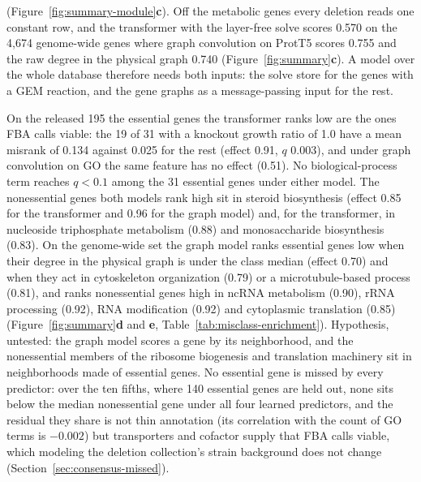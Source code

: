 \begin{description}
    (Figure~\ref{fig:summary-module}\textbf{c}). Off the metabolic genes every deletion reads
    one constant row, and the transformer with the layer-free solve scores 0.570 on
    the 4,674 genome-wide genes where graph convolution on ProtT5 scores 0.755 and the
    raw degree in the physical graph 0.740 (Figure~\ref{fig:summary}\textbf{c}). A
    model over the whole database therefore needs both inputs: the solve store for the
    genes with a GEM reaction, and the gene graphs as a message-passing input for the
    rest.
  \item[The two families miss different genes, and the annotations say which.] On the
    released 195 the essential genes the transformer ranks low are the ones FBA calls
    viable: the 19 of 31 with a knockout growth ratio of 1.0 have a mean misrank of
    0.134 against 0.025 for the rest (effect 0.91, $q$ 0.003), and under graph
    convolution on GO the same feature has no effect (0.51). No biological-process term
    reaches $q < 0.1$ among the 31 essential genes under either model. The nonessential
    genes both models rank high sit in steroid biosynthesis (effect 0.85 for the
    transformer and 0.96 for the graph model) and, for the transformer, in nucleoside
    triphosphate metabolism (0.88) and monosaccharide biosynthesis (0.83). On the
    genome-wide set the graph model ranks essential genes low when their degree in the
    physical graph is under the class median (effect 0.70) and when they act in
    cytoskeleton organization (0.79) or a microtubule-based process (0.81), and ranks
    nonessential genes high in ncRNA metabolism (0.90), rRNA processing (0.92), RNA
    modification (0.92) and cytoplasmic translation (0.85)
    (Figure~\ref{fig:summary}\textbf{d} and \textbf{e},
    Table~\ref{tab:misclass-enrichment}). Hypothesis, untested: the graph model scores
    a gene by its neighborhood, and the nonessential members of the ribosome biogenesis
    and translation machinery sit in neighborhoods made of essential genes. No essential
    gene is missed by every predictor: over the ten fifths, where 140 essential genes
    are held out, none sits below the median nonessential gene under all four learned
    predictors, and the residual they share is not thin annotation (its correlation with
    the count of GO terms is $-0.002$) but transporters and cofactor supply that FBA
    calls viable, which modeling the deletion collection's strain background does not
    change (Section~\ref{sec:consensus-missed}).
\end{description}

